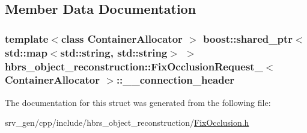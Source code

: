 \subsection{\-Member \-Data \-Documentation}
\hypertarget{structhbrs__object__reconstruction_1_1_fix_occlusion_request___ac05d4186ac4621275d62e4514ae308fc}{
\subsubsection[{\-\_\-\-\_\-connection\-\_\-header}]{\setlength{\rightskip}{0pt plus 5cm}template$<$class Container\-Allocator $>$ boost\-::shared\-\_\-ptr$<$std\-::map$<$std\-::string, std\-::string$>$ $>$ {\bf hbrs\-\_\-object\-\_\-reconstruction\-::\-Fix\-Occlusion\-Request\-\_\-}$<$ \-Container\-Allocator $>$\-::{\bf \-\_\-\-\_\-connection\-\_\-header}}}\label{structhbrs__object__reconstruction_1_1_fix_occlusion_request___ac05d4186ac4621275d62e4514ae308fc}


\-The documentation for this struct was generated from the following file\-:\begin{DoxyCompactItemize}
\item 
srv\-\_\-gen/cpp/include/hbrs\-\_\-object\-\_\-reconstruction/\hyperlink{_fix_occlusion_8h}{\-Fix\-Occlusion.\-h}\end{DoxyCompactItemize}
